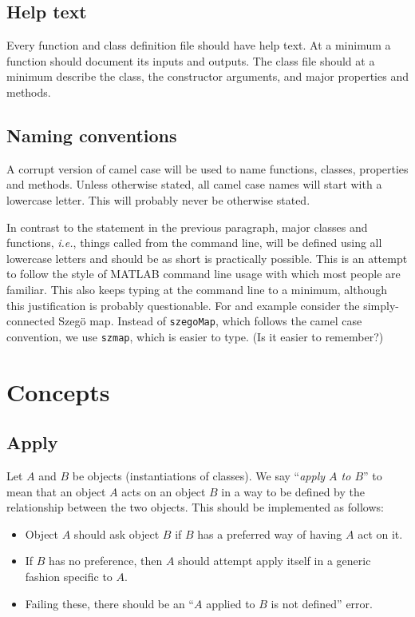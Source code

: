 \documentclass[12pt]{article}
\begin{document}
\subsection{Help text}
Every function and class definition file should have help text. At a minimum a function should document its inputs and outputs. The class file should at a minimum describe the class, the constructor arguments, and major properties and methods.

\subsection{Naming conventions}

A corrupt version of camel case will be used to name functions, classes, properties and methods. Unless otherwise stated, all camel case names will start with a lowercase letter. This will probably never be otherwise stated.

In contrast to the statement in the previous paragraph, major classes and functions, \textit{i.e.}, things called from the command line, will be defined using all lowercase letters and should be as short is practically possible. This is an attempt to follow the style of MATLAB command line usage with which most people are familiar. This also keeps typing at the command line to a minimum, although this justification is probably questionable. For and example consider the simply-connected Szeg\"o map. Instead of \verb+szegoMap+, which follows the camel case convention, we use \verb+szmap+, which is easier to type. (Is it easier to remember?)

\section{Concepts}
\subsection{Apply}
Let $A$ and $B$ be objects (instantiations of classes). We say ``\emph{apply $A$ to $B$}'' to mean that an object $A$ acts on an object $B$ in a way to be defined by the relationship between the two objects. This should be implemented as follows:
\begin{itemize}
  \item Object $A$ should ask object $B$ if $B$ has a preferred way of having $A$ act on it.
  \item If $B$ has no preference, then $A$ should attempt apply itself in a generic fashion specific to $A$.
  \item Failing these, there should be an ``$A$ applied to $B$ is not defined'' error.
\end{itemize}
\end{document}

